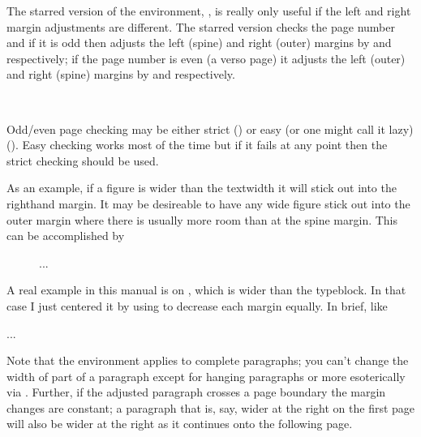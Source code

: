     The starred version of the environment, , is really only
useful if the left and right margin adjustments are different. 
The starred version checks the page number and if it is odd then adjusts 
the left (spine) and right (outer) margins 
by  and  respectively; if the page number is even 
(a verso page) it adjusts the left (outer) and right (spine) 
margins by  and  respectively.

\begin{syntax}
\cmd{\strictpagecheck} \cmd{\easypagecheck} \\
\end{syntax}

Odd/even page checking may be either strict (\cmd{\strictpagecheck})
or easy (or one might call it lazy) (\cmd{\easypagecheck}). Easy
checking works most of the time but if it fails at any point then the
strict checking should be used.

    As an example, if a figure is wider than the textwidth 
it will stick out into the righthand margin. It may be 
desireable to have any wide figure stick out into the 
outer margin where there is usually more room than at
the spine margin. This can be accomplished by
\begin{lcode}
\begin{figure}
\centering
\strictpagecheck
\begin{adjustwidth*}{0em}{-3em}
\caption{...}
\end{adjustwidth*}
\end{figure}
\end{lcode}

    A real example in this manual is  on ,
which is wider than the typeblock. In that case I 
just centered it by using  to decrease each 
margin equally. In brief, like
\begin{lcode}
\begin{table}
\begin{adjustwidth}{-1cm}{-1cm}
\centering
...
\end{adjustwidth}
\end{table}
\end{lcode}

    Note that the  environment applies to complete paragraphs;
you can't change the width of part of a paragraph 
except for hanging paragraphs or more esoterically 
via \cmd{\parshape}. Further, if the adjusted paragraph crosses a
page boundary the margin changes are constant; a paragraph 
that is, say, wider at the right on the first page will also be wider at 
the right as it continues onto the following page.

